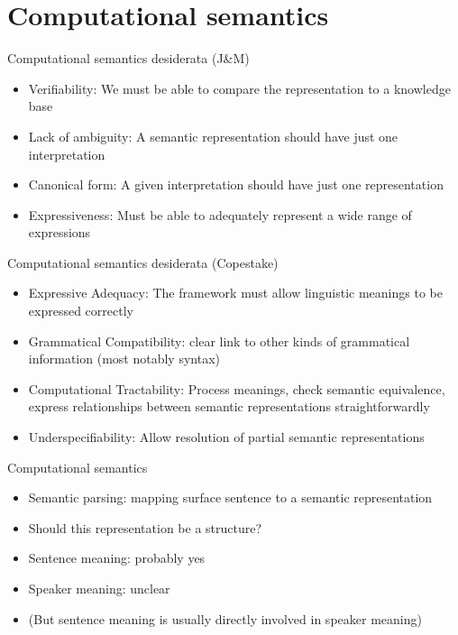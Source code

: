 \documentclass{beamer}
\begin{document}
\section{Computational semantics}

\begin{frame}{Computational semantics desiderata (J\&M)}
  \begin{itemize}
  \item Verifiability: We must be able to compare the representation to a knowledge base
  \item Lack of ambiguity: A semantic representation should have just one interpretation
  \item Canonical form: A given interpretation should have just one representation
  \item Expressiveness: Must be able to adequately represent a wide range of expressions
  \end{itemize}
\end{frame}

\begin{frame}{Computational semantics desiderata (Copestake)}
  \begin{itemize}
  \item Expressive Adequacy: The framework must allow linguistic meanings to be expressed correctly
  \item Grammatical Compatibility: clear link to other kinds of grammatical information (most notably syntax)
  \item Computational Tractability: Process meanings, check semantic
    equivalence, express relationships between semantic
    representations straightforwardly
  \item Underspecifiability: Allow resolution of partial semantic representations
  \end{itemize}
\end{frame}

\begin{frame}{Computational semantics}
  \begin{itemize}
  \item Semantic parsing: mapping surface sentence to a semantic representation
  \item Should this representation be a structure?
  \item Sentence meaning: probably yes
  \item Speaker meaning: unclear
  \item (But sentence meaning is usually directly involved in speaker meaning)
  \end{itemize}
\end{frame}
\end{document}
